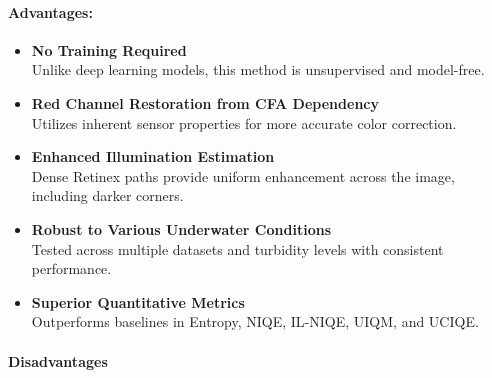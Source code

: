 \documentclass{article}
\begin{document}
\paragraph{Advantages:}
\begin{itemize}
    \item \textbf{No Training Required} \\
    Unlike deep learning models, this method is unsupervised and model-free.

    \item \textbf{Red Channel Restoration from CFA Dependency} \\
    Utilizes inherent sensor properties for more accurate color correction.

    \item \textbf{Enhanced Illumination Estimation} \\
    Dense Retinex paths provide uniform enhancement across the image, including darker corners.

    \item \textbf{Robust to Various Underwater Conditions} \\
    Tested across multiple datasets and turbidity levels with consistent performance.

    \item \textbf{Superior Quantitative Metrics} \\
    Outperforms baselines in Entropy, NIQE, IL-NIQE, UIQM, and UCIQE.
\end{itemize}

\paragraph{Disadvantages}
\end{document}
